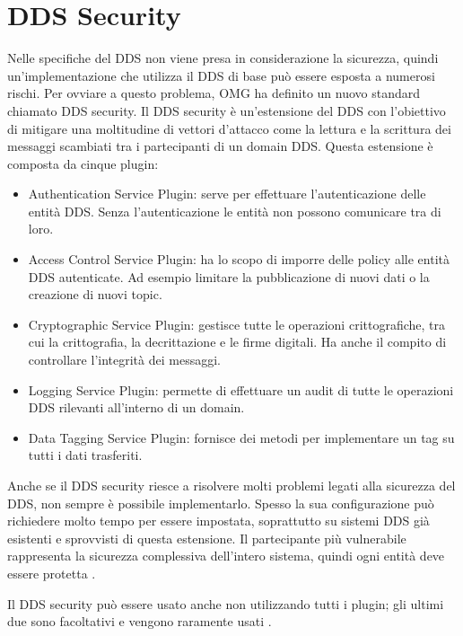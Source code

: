 \section{DDS Security}
Nelle specifiche del DDS non viene presa in considerazione la sicurezza, quindi
un'implementazione che utilizza il DDS di base può essere esposta a numerosi 
rischi. Per ovviare a questo problema, OMG ha definito un nuovo standard 
chiamato DDS security. Il DDS security è un'estensione del DDS con 
l'obiettivo di mitigare una moltitudine di vettori d'attacco come 
la lettura e la scrittura dei messaggi scambiati tra i partecipanti di un 
domain DDS. Questa estensione è composta da cinque plugin:
\begin{itemize}
    \item Authentication Service Plugin: serve per effettuare l'autenticazione 
    delle entità DDS. Senza l'autenticazione le entità non possono
    comunicare tra di loro.
    \item Access Control Service Plugin: ha lo scopo di imporre 
    delle policy alle entità DDS autenticate. Ad esempio limitare
    la pubblicazione di nuovi dati o la creazione di nuovi topic.
    \item Cryptographic Service Plugin: gestisce tutte le operazioni 
    crittografiche, tra cui la crittografia, la decrittazione e
    le firme digitali. Ha anche il compito di controllare l'integrità
    dei messaggi.
    \item Logging Service Plugin: permette di effettuare un audit di 
    tutte le operazioni DDS rilevanti all'interno di un domain.
    \item Data Tagging Service Plugin: fornisce dei metodi per implementare
    un tag su tutti i dati trasferiti. 
\end{itemize}
Anche se il DDS security riesce a risolvere molti problemi legati alla
sicurezza del DDS, non sempre è possibile implementarlo. Spesso 
la sua configurazione può richiedere molto tempo per essere 
impostata, soprattutto su sistemi DDS già esistenti e sprovvisti di 
questa estensione.
Il partecipante più vulnerabile rappresenta la sicurezza
complessiva dell'intero sistema, quindi ogni entità deve essere
protetta \cite{Michaud2017Apr}. 

Il DDS security può essere usato anche non utilizzando tutti i plugin;
gli ultimi due sono facoltativi e vengono 
raramente usati \cite{essay93639}. 
\label{DDS Security}



